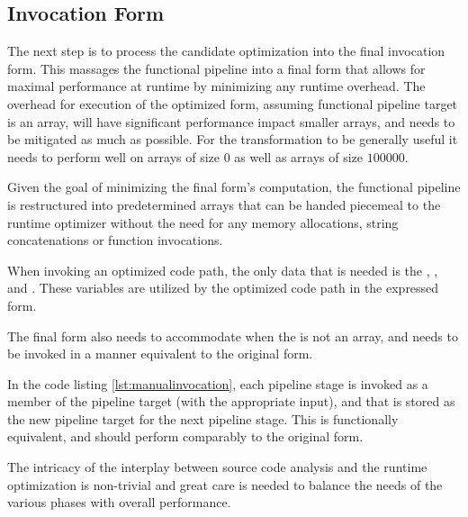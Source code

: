\subsection{Invocation Form}
The next step is to process the candidate optimization into the final invocation form.  This massages the functional pipeline into a final form that allows for maximal performance at runtime by minimizing any runtime overhead.  The overhead for execution of the optimized form, assuming functional pipeline target is an array, will have significant performance impact smaller arrays, and needs to be mitigated as much as possible.  For the transformation to be generally useful it needs to perform well on arrays of size $0$ as well as arrays of size $100000$.  

\begin{minipage}{\linewidth}

\end{minipage}

Given the goal of minimizing the final form's computation, the functional pipeline is restructured into predetermined arrays that can be handed piecemeal to the runtime optimizer without the need for any memory allocations, string concatenations or function invocations.

When invoking an optimized code path, the only data that is needed is the , ,  and .  These variables are utilized by the optimized code path in the expressed form. 

The final form also needs to accommodate when the  is not an array, and needs to be invoked in a manner equivalent to the original form.  \\

\begin{minipage}{\linewidth}

\end{minipage}

In the code listing \ref{lst:manualinvocation}, each pipeline stage is invoked as a member of the pipeline target (with the appropriate input), and that is stored as the new pipeline target for the next pipeline stage.  This is functionally equivalent, and should perform comparably to the original form. 




The intricacy of the interplay between source code analysis and the runtime optimization is non-trivial and great care is needed to balance the needs of the various phases with overall performance.  